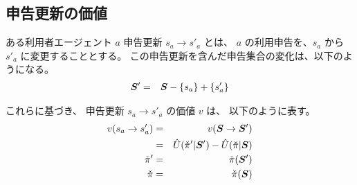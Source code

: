 \subsection{申告更新の価値}
ある利用者エージェント $a$ 申告更新 $s_a \to s'_a$ とは、
$a$ の利用申告を、$s_a$ から $s'_a$ に変更することとする。
この申告更新を含んだ申告集合の変化は、以下のようになる。
  \begin{eqnarray}
    {\bm{S}}' & = & {\bm{S}} - \left\{ s_a \right\} + \left\{ s'_a \right\}
  \end{eqnarray}

これらに基づき、
申告更新 $s_a \to s'_a$ の価値 $v$ は、
以下のように表す。
  \begin{eqnarray}
    v(s_a \to s'_a) & = & v({\bm{S}} \to {\bm{S}}')
  \\
      & = &
        \hat{U}(\check{\pi}' | {\bm{S}}') -
        \hat{U}(\check{\pi} | {\bm{S}})
  \\
    \check{\pi}' & = & \check{\pi}({\bm{S}}')
  \\
    \check{\pi} & = & \check{\pi}({\bm{S}})
  \end{eqnarray}




